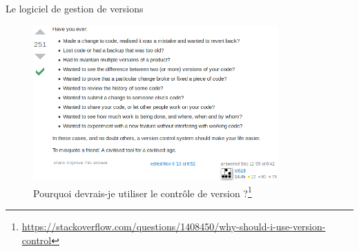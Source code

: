 \documentclass[xcolor=x11names,compress]{beamer}
\begin{document}

\begin{frame}{Le logiciel de gestion de versions}
	\begin{figure}[H]
		\includegraphics[width=9.4cm]{images/intro/cvs.png}
		\vspace{-10px}
		\caption{Pourquoi devrais-je utiliser le contrôle de version ?\footnote{\tiny\url{https://stackoverflow.com/questions/1408450/why-should-i-use-version-control}}}
	\end{figure}
\end{frame}
\end{document}
